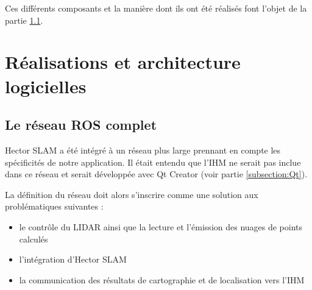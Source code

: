Ces différents composants et la manière dont ils ont été réalisés font l'objet de la partie \ref{subsection:ROSnodes}. 

\section{Réalisations et architecture logicielles}

  \subsection{Le réseau ROS complet}
  \label{subsection:ROSnodes}
  
\gls{Hector SLAM} a été intégré à un réseau plus large prennant en compte les spécificités de notre application. 
Il était entendu que l'\gls{IHM} ne serait pas inclue dans ce réseau et serait développée avec Qt Creator (voir partie \ref{subsection:Qt}).  

La définition du réseau doit alors s'inscrire comme une solution aux problématiques suivantes : 

\begin{itemize}
  \item le contrôle du \gls{LIDAR} ainsi que la lecture et l'émission des nuages de points calculés
  \item l'intégration d'\gls{Hector SLAM} 
  \item la communication des résultats de cartographie et de localisation vers l'\gls{IHM}
\end{itemize}

\begin{figure}[h]
  \label{fig:rosnet}
\end{figure}

